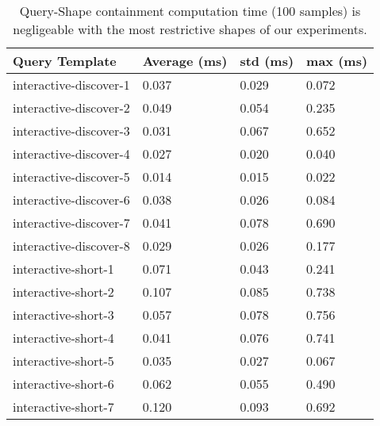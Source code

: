 \begin{table}
	\begin{center}
		\begin{tabular}{|l|l|l|l|}
			\hline
			Query Template & Average (ms) & std (ms) & max (ms) \\
			\hline
			interactive-discover-1 & 0.037 & 0.029 & 0.072 \\
			\hline
			interactive-discover-2 & 0.049 & 0.054 & 0.235 \\
			\hline
			interactive-discover-3 & 0.031 & 0.067 & 0.652 \\
			\hline
			interactive-discover-4 & 0.027 & 0.020 & 0.040 \\
			\hline
			interactive-discover-5 & 0.014 & 0.015 & 0.022 \\
			\hline
			interactive-discover-6 & 0.038 & 0.026 & 0.084 \\
			\hline
			interactive-discover-7 & 0.041 & 0.078 & 0.690 \\
			\hline
			interactive-discover-8 & 0.029 & 0.026 & 0.177 \\
			\hline
			interactive-short-1 & 0.071 & 0.043 & 0.241 \\
			\hline
			interactive-short-2 & 0.107 & 0.085 & 0.738 \\
			\hline
			interactive-short-3 & 0.057 & 0.078 & 0.756 \\
			\hline
			interactive-short-4 & 0.041 & 0.076 & 0.741 \\
			\hline
			interactive-short-5 & 0.035 & 0.027 & 0.067 \\
			\hline
			interactive-short-6 & 0.062 & 0.055 & 0.490 \\
			\hline
			interactive-short-7 & 0.120 & 0.093 & 0.692 \\
			\hline
		\end{tabular}
	\end{center}
	\caption{Query-Shape containment computation time (100 samples) is negligeable with the most restrictive shapes of our experiments.}
	\label{tab:queryShapeContainmentEval}
\end{table}